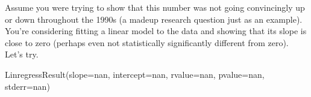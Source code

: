 \documentclass[letterpaper,10pt,english]{jupyterBook}
\begin{document}
\begin{sphinxVerbatim}[commandchars=\\\{\}]
   
 \PYG{p}{[}\PYG{p}{]} \PYG{p}{[}\PYG{p}{]} 
  
 \PYG{p}{[}\PYG{p}{]} 
  
  
   
\end{sphinxVerbatim}

\noindent{}

\sphinxAtStartPar
Assume you were trying to show that this number was not going convincingly up or down throughout the 1990s (a made\sphinxhyphen{}up research question just as an example).  You’re considering fitting a linear model to the data and showing that its slope is close to zero (perhaps even not statistically significantly different from zero).  Let’s try.

\begin{sphinxVerbatim}[commandchars=\\\{\}]
   
 \PYG{p}{[}\PYG{p}{]} \PYG{p}{[}\PYG{p}{]} 
\end{sphinxVerbatim}

\begin{sphinxVerbatim}[commandchars=\\\{\}]
LinregressResult(slope=nan, intercept=nan, rvalue=nan, pvalue=nan, stderr=nan)
\end{sphinxVerbatim}
\end{document}
